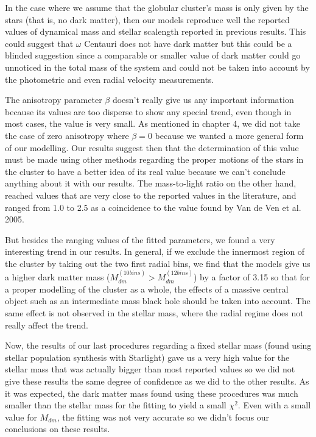 In the case where we assume that the globular cluster's mass is only given by the stars (that is, no dark matter), then our models reproduce well the reported values of dynamical mass and stellar scalength reported in previous results. This could suggest that $\omega$ Centauri does not have dark matter but this could be a blinded suggestion since a comparable or smaller value of dark matter could go unnoticed in the total mass of the system and could not be taken into account by the photometric and even radial velocity measurements.   

The anisotropy parameter $\beta$ doesn't really give us any important information because its values are too disperse to show any special trend, even though in most cases, the value is very small. As mentioned in chapter 4, we did not take the case of zero anisotropy where $\beta = 0$ because we wanted a more general form of our modelling. Our results suggest then that the determination of this value must be made using other methods regarding the proper motions of the stars in the cluster to have a better idea of its real value because we can't conclude anything about it with our results. The mass-to-light ratio on the other hand, reached values that are very close to the reported values in the literature, and ranged from 1.0 to 2.5 as a coincidence to the value found by Van de Ven et al. 2005.

But besides the ranging values of the fitted parameters, we found a very interesting trend in our results. In general, if we exclude the innermost region of the cluster by taking out the two first radial bins, we find that the models give us a higher dark matter mass ($M_{dm}^{(10 bins)}>M_{dm}^{(12 bins)}$) by a factor of 3.15 so that for a proper modelling of the cluster as a whole, the effects of a massive central object such as an intermediate mass black hole should be taken into account. The same effect is not observed in the stellar mass, where the radial regime does not really affect the trend.

Now, the results of our last procedures regarding a fixed stellar mass (found using stellar population synthesis with Starlight) gave us a very high value for the stellar mass that was actually bigger than most reported values so we did not give these results the same degree of confidence as we did to the other results. As it was expected, the dark matter mass found using these procedures was much smaller than the stellar mass for the fitting to yield a small $\chi^{2}$. Even with a small value for $M_{dm}$, the fitting was not very accurate so we didn't focus our conclusions on these results.

